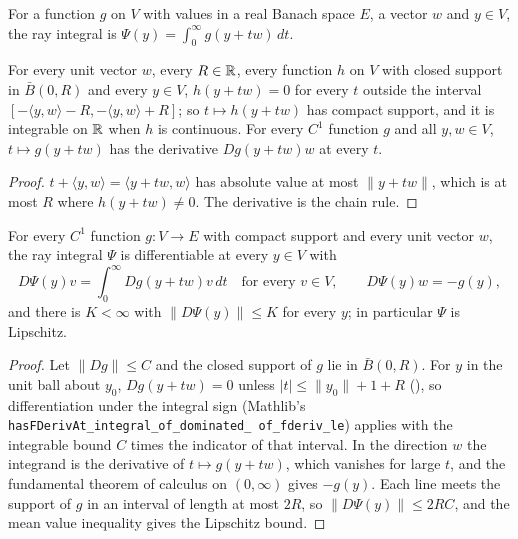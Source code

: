 \begin{definition}
\label{def:ray-integral}
\leanok
For a function $g$ on $V$ with values in a real Banach space $E$, a vector $w$ and $y \in V$,
the ray integral is $\Psi(y) = \int_0^\infty g(y + t w) \, dt$.
\end{definition}

\begin{lemma}
\label{lem:compact-support-lines}
\leanok
For every unit vector $w$, every $R \in \mathbb{R}$, every function $h$ on $V$ with closed support in
$\bar B(0, R)$ and every $y \in V$, $h(y + t w) = 0$ for every $t$ outside the interval
$[-\langle y, w \rangle - R, -\langle y, w \rangle + R]$; so $t \mapsto h(y + t w)$ has compact
support, and it is integrable on $\mathbb{R}$ when $h$ is continuous. For every $C^1$ function $g$ and all
$y, w \in V$, $t \mapsto g(y + t w)$ has the derivative $Dg(y + t w) w$ at every $t$.
\end{lemma}

\begin{proof}
\leanok
$t + \langle y, w \rangle = \langle y + t w, w \rangle$ has absolute value at most
$\|y + t w\|$, which is at most $R$ where $h(y + t w) \neq 0$. The derivative is the chain rule.
\end{proof}

\begin{lemma}
\label{lem:ray-integral-derivative}
\leanok
{}
For every $C^1$ function $g \colon V \to E$ with compact support and every unit vector $w$, the
ray integral $\Psi$ is differentiable at every $y \in V$ with
\[
  D\Psi(y) v = \int_0^\infty Dg(y + t w) v \, dt \quad \text{for every } v \in V ,
  \qquad D\Psi(y) w = -g(y) ,
\]
and there is $K < \infty$ with $\|D\Psi(y)\| \leq K$ for every $y$; in particular $\Psi$ is
Lipschitz.
\end{lemma}

\begin{proof}
\leanok
Let $\|Dg\| \leq C$ and the closed support of $g$ lie in $\bar B(0, R)$. For $y$ in the unit ball
about $y_0$, $Dg(y + t w) = 0$ unless $|t| \leq \|y_0\| + 1 + R$
(), so differentiation under the integral sign (Mathlib's
\texttt{hasFDerivAt\_\allowbreak integral\_\allowbreak of\_\allowbreak dominated\_\allowbreak
of\_\allowbreak fderiv\_\allowbreak le}) applies with the integrable bound $C$ times the
indicator of that interval. In the direction $w$ the integrand is the derivative of
$t \mapsto g(y + t w)$, which vanishes for large $t$, and the fundamental theorem of calculus on
$(0, \infty)$ gives $-g(y)$. Each line meets the support of $g$ in an interval of length at most
$2R$, so $\|D\Psi(y)\| \leq 2 R C$, and the mean value inequality gives the Lipschitz bound.
\end{proof}

